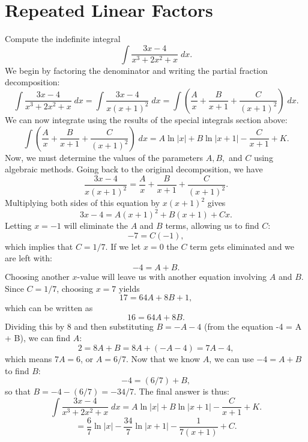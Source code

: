 \documentclass{ximera}
\begin{document}
\section{Repeated Linear Factors}

\begin{example}
Compute the indefinite integral
\[
\int \frac{3x - 4}{x^3 + 2x^2 + x} \; dx.
\]
We begin by factoring the denominator and writing the partial fraction decomposition:
\[
\int \frac{3x - 4}{x^3 + 2x^2 + x} \; dx = \int \frac{3x - 4}{x(x+1)^2} \; dx = \int \left(\frac{A}{x} + \frac{B}{x+1} + \frac{C}{(x+1)^2} \right) \; dx.
\]
We can now integrate using the results of the special integrals section above:
\[
\int \left(\frac{A}{x} + \frac{B}{x+1} + \frac{C}{(x+1)^2} \right) \; dx = A\ln|x| + B\ln|x+1| - \frac{C}{x+1} + K.
\]
Now, we must determine the values of the parameters $A, B, $ and $C$ using algebraic methods.
Going back to the original decomposition, we have
\[
\frac{3x - 4}{x(x+1)^2} = \frac{A}{x} + \frac{B}{x+1} + \frac{C}{(x+1)^2}.
\]
Multiplying both sides of this equation by $x(x+1)^2$ gives
\[
3x-4 = A(x+1)^2 + B(x+1) + Cx.
\]
Letting $x = -1$ will eliminate the $A$ and $B$ terms, allowing us to find $C$:
\[
-7 = C(-1),
\]
which implies that $C = 1/7$.  If we let $x = 0$ the $C$ term gets eliminated and we are left with:
\[
-4 = A + B.
\]
Choosing another $x$-value will leave us with another equation involving $A$ and $B$.  Since $C = 1/7$, choosing $x = 7$ yields
\[
17 = 64A + 8B + 1,
\]
which can be written as 
\[
16 = 64A + 8B.
\]
Dividing this by 8 and then substituting $B = -A - 4$ (from the equation -4 = A + B), we can find $A$:
\[
2 = 8A + B = 8A + (-A-4) = 7A -4,
\]
which means $7A = 6$, or $A = 6/7$.
Now that we know $A$, we can use $-4 = A + B$ to find $B$:
\[
-4 = (6/7) + B,
\]
so that $B = -4 - (6/7) = -34/7$. The final answer is thus:
\[
\int \frac{3x - 4}{x^3 + 2x^2 + x} \; dx = A\ln|x| + B\ln|x+1| - \frac{C}{x+1} + K.
\]
\[
= \frac67\ln|x| -\frac{34}{7}\ln|x+1| - \frac{1}{7(x+1)} + C.
\]


\end{example}
\end{document}
